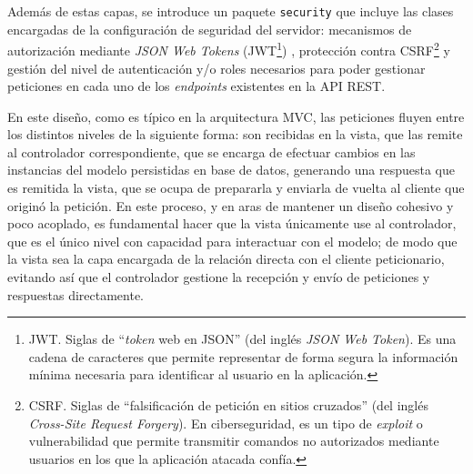 Además de estas capas, se introduce un paquete \texttt{security} que incluye las clases encargadas de la configuración de seguridad del servidor: mecanismos de autorización mediante \textit{JSON Web Tokens} (JWT\footnote{JWT. Siglas de ``\textit{token} web en JSON'' (del inglés \textit{JSON Web Token}). Es una cadena de caracteres que permite representar de forma segura la información mínima necesaria para identificar al usuario en la aplicación.}) \cite{Arq_JWT}, protección contra CSRF\footnote{CSRF. Siglas de ``falsificación de petición en sitios cruzados'' (del inglés \textit{Cross-Site Request Forgery}). En ciberseguridad, es un tipo de \textit{exploit} o vulnerabilidad que permite transmitir comandos no autorizados mediante usuarios en los que la aplicación atacada confía.} \cite{Arq_CSRF} y gestión del nivel de autenticación y/o roles necesarios para poder gestionar peticiones en cada uno de los \textit{endpoints} existentes en la API REST.

En este diseño, como es típico en la arquitectura MVC, las peticiones fluyen entre los distintos niveles de la siguiente forma: son recibidas en la vista, que las remite al controlador correspondiente, que se encarga de efectuar cambios en las instancias del modelo persistidas en base de datos, generando una respuesta que es remitida la vista, que se ocupa de prepararla y enviarla de vuelta al cliente que originó la petición. En este proceso, y en aras de mantener un diseño cohesivo y poco acoplado, es fundamental hacer que la vista únicamente use al controlador, que es el único nivel con capacidad para interactuar con el modelo; de modo que la vista sea la capa encargada de la relación directa con el cliente peticionario, evitando así que el controlador gestione la recepción y envío de peticiones y respuestas directamente.


